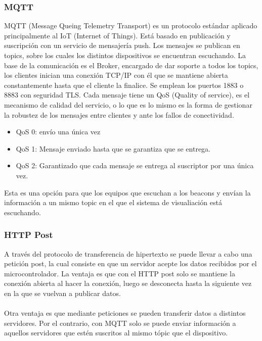 \documentclass[paper=a4, fontsize=11pt,twoside]{scrartcl}	%
\begin{document}
\begin{enumerate}
        \subsubsection {MQTT}
            MQTT (Message Queing Telemetry Transport) es un protocolo estándar aplicado principalmente al IoT (Internet of Things). Está basado en publicación y 
            suscripción con un servicio de mensajería push. Los mensajes se publican en topics, sobre los cuales los distintos 
            dispositivos se encuentran escuchando.
            La base de la comunicación es el Broker, encargado de dar soporte a todos los topics, los clientes inician una 
            conexión TCP/IP con él que se mantiene abierta constantemente hasta que el cliente la finalice. Se emplean los puertos
            1883 o 8883 con seguridad TLS.
            Cada mensaje tiene un QoS (Quality of service), es el mecanismo de calidad del servicio, o lo que es lo mismo es la forma de
            gestionar la robustez de los mensajes entre clientes y ante los fallos de conectividad.
            \begin{itemize}
                \item QoS 0: envío una única vez
                \item QoS 1: Mensaje enviado hasta que se garantiza que se entrega.
                \item QoS 2: Garantizado que cada mensaje se entrega al suscriptor por una única vez.
            \end{itemize}
            Esta es una opción para que los equipos que escuchan a los beacons y envían la información a un mismo
            topic en el que el sistema de visualiación está escuchando.
        \subsubsection {HTTP Post}
            A través del protocolo de transferencia de hipertexto se puede llevar a cabo una petición post, la cual consiste en que
            un servidor acepte los datos recibidos por el microcontrolador.
            La ventaja es que con el HTTP post solo se mantiene la conexión abierta al hacer la conexión, luego se desconecta hasta 
            la siguiente vez en la que se vuelvan a publicar datos. 
            \paragraph{}
            Otra ventaja es que mediante peticiones se pueden transferir datos a distintos servidores.
            Por el contrario, con MQTT solo se puede enviar información a aquellos servidores que estén suscritos al mismo tópic que el dispositivo.

\end{enumerate}
\end{document}
